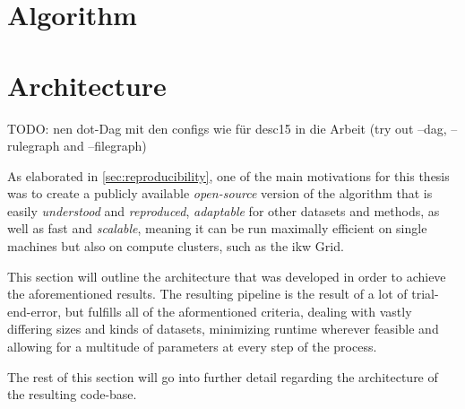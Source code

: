 \section{Algorithm}





\section{Architecture}
\label{sec:architecture}

TODO: nen dot-Dag mit den configs wie für desc15 in die Arbeit 
(try out --dag, --rulegraph and --filegraph)

As elaborated in \autoref{sec:reproducibility}, one of the main motivations for this thesis was to create a publicly available \textit{open-source} version of the algorithm that is easily \textit{understood} and \textit{reproduced}, \textit{adaptable} for other datasets and methods, as well as fast and \textit{scalable}, meaning it can be run maximally efficient on single machines but also on compute clusters, such as the \acrshort{ikw} Grid.


This section will outline the architecture that was developed in order to achieve the aforementioned results. The resulting pipeline is the result of a lot of trial-end-error, but fulfills all of the aformentioned criteria, dealing with vastly differing sizes and kinds of datasets, minimizing runtime wherever feasible and allowing for a multitude of parameters at every step of the process. %

The rest of this section will go into further detail regarding the architecture of the resulting code-base. 

